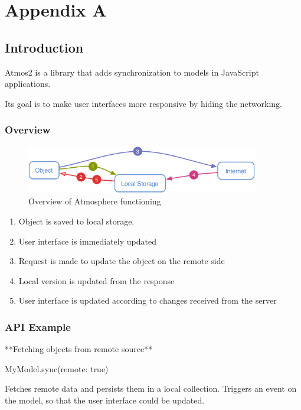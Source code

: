 \section*{Appendix A}

\subsection{Introduction}

Atmos2 is a library that adds synchronization to models in JavaScript applications. 

Its goal is to make user interfaces more responsive by hiding the networking. 

\subsubsection{Overview}

\begin{figure}[htbp]
  \centering
    \includegraphics[width=4in]{figures/atmos-02.png}
  \caption{Overview of Atmosphere functioning}
  \label{fig:figures_atmos-02}
\end{figure}

\begin{enumerate}
\item Object is saved to local storage. 
\item User interface is immediately updated
\item Request is made to update the object on the remote side
\item Local version is updated from the response
\item User interface is updated according to changes received from the server
\end{enumerate}



\subsubsection{API Example}

**Fetching objects from remote source**

    MyModel.sync(remote: true)

Fetches remote data and persists them in a local collection. Triggers an event on the model, so that the user interface could be updated.

